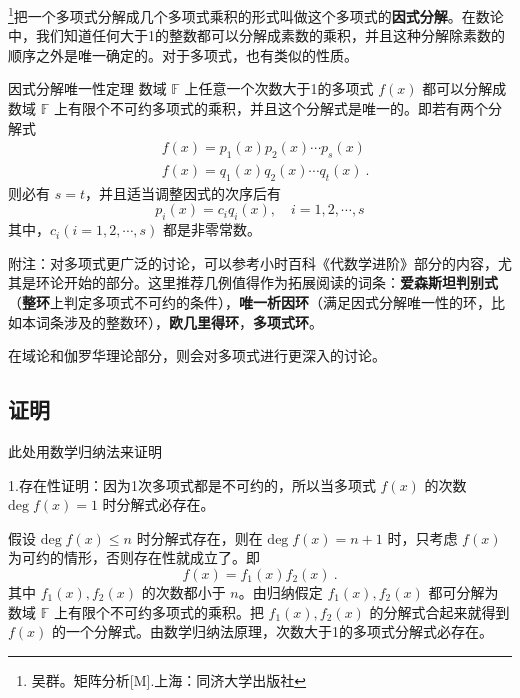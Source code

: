 
\footnote{吴群。矩阵分析[M].上海：同济大学出版社}把一个多项式分解成几个多项式乘积的形式叫做这个多项式的\textbf{因式分解}。在数论中，我们知道任何大于1的整数都可以分解成素数的乘积，并且这种分解除素数的顺序之外是唯一确定的。对于多项式，也有类似的性质。
\begin{theorem}{因式分解唯一性定理}
数域 $\mathbb{F}$ 上任意一个次数大于1的多项式 $f(x)$ 都可以分解成数域 $\mathbb{F}$ 上有限个不可约多项式的乘积，并且这个分解式是唯一的。即若有两个分解式
 \begin{equation}
 \begin{aligned}
 &f(x)=p_1(x)p_2(x)\cdots p_s(x)\\
 &f(x)=q_1(x)q_2(x)\cdots q_t(x)~.
 \end{aligned}
 \end{equation}
 则必有 $s=t$，并且适当调整因式的次序后有
 \begin{equation}
 p_i(x)=c_iq_i(x),\quad i=1,2,\cdots,s
 \end{equation}
 其中，$c_i(i=1,2,\cdots,s)$ 都是非零常数。
\end{theorem}


附注：对多项式更广泛的讨论，可以参考小时百科《代数学进阶》部分的内容，尤其是环论开始的部分。这里推荐几例值得作为拓展阅读的词条：\textbf{爱森斯坦判别式}（\textbf{整环}上判定多项式不可约的条件），\textbf{唯一析因环}（满足因式分解唯一性的环，比如本词条涉及的整数环），\textbf{欧几里得环}，\textbf{多项式环}。

在域论和伽罗华理论部分，则会对多项式进行更深入的讨论。


\subsection{证明}此处用数学归纳法来证明

1.存在性证明：因为1次多项式都是不可约的，所以当多项式 $f(x)$ 的次数 $\mathrm{deg}\;f(x)=1$ 时分解式必存在。

假设 $\mathrm{deg}\;f(x)\leq n$ 时分解式存在，则在 $\mathrm{deg}\;f(x)=n+1$ 时，只考虑 $f(x)$ 为可约的情形，否则存在性就成立了。即
\begin{equation}
f(x)=f_1(x)f_2(x)~.
\end{equation}
其中 $f_1(x),f_2(x)$ 的次数都小于 $n$。由归纳假定 $f_1(x),f_2(x)$ 都可分解为数域 $\mathbb{F}$ 上有限个不可约多项式的乘积。把 $f_1(x),f_2(x)$ 的分解式合起来就得到 $f(x)$ 的一个分解式。由数学归纳法原理，次数大于1的多项式分解式必存在。

